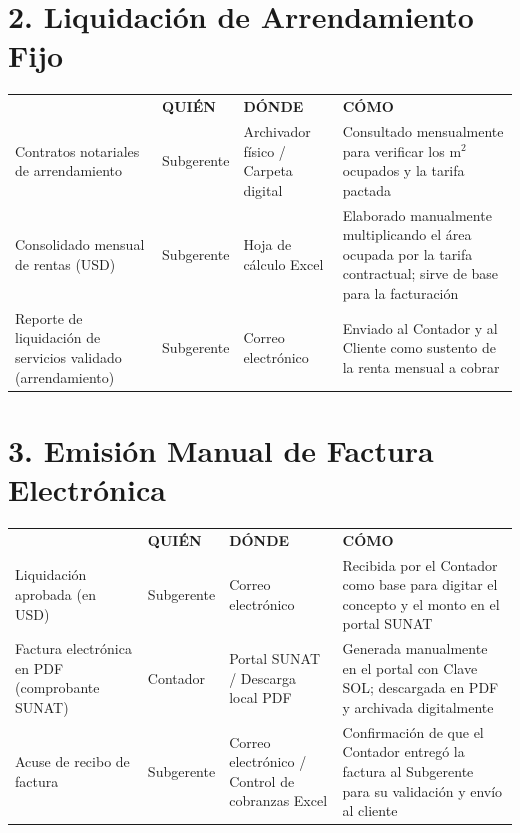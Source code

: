 \documentclass[11pt,letterpaper]{report}
\begin{document}
\section*{2. Liquidación de Arrendamiento Fijo}
\begin{tabularx}{\textwidth}{>{\raggedright\arraybackslash}X >{\raggedright\arraybackslash}p{} >{\raggedright\arraybackslash}p{} >{\raggedright\arraybackslash}X}
\toprule
\multirow{2}{*}{\textbf{DOCUMENTO (QUÉ)}} & \multicolumn{3}{c}{\textbf{CUSTODIA}} \\
\cmidrule{2-4}
& \textbf{QUIÉN} & \textbf{DÓNDE} & \textbf{CÓMO} \\
\midrule
Contratos notariales de arrendamiento & Subgerente & Archivador físico / Carpeta digital & Consultado mensualmente para verificar los m$^2$ ocupados y la tarifa pactada \\
\midrule
Consolidado mensual de rentas (USD) & Subgerente & Hoja de cálculo Excel & Elaborado manualmente multiplicando el área ocupada por la tarifa contractual; sirve de base para la facturación \\
\midrule
Reporte de liquidación de servicios validado (arrendamiento) & Subgerente & Correo electrónico & Enviado al Contador y al Cliente como sustento de la renta mensual a cobrar \\
\bottomrule
\end{tabularx}

\vspace{2em}

\section*{3. Emisión Manual de Factura Electrónica}
\begin{tabularx}{\textwidth}{>{\raggedright\arraybackslash}X >{\raggedright\arraybackslash}p{} >{\raggedright\arraybackslash}p{} >{\raggedright\arraybackslash}X}
\toprule
\multirow{2}{*}{\textbf{DOCUMENTO (QUÉ)}} & \multicolumn{3}{c}{\textbf{CUSTODIA}} \\
\cmidrule{2-4}
& \textbf{QUIÉN} & \textbf{DÓNDE} & \textbf{CÓMO} \\
\midrule
Liquidación aprobada (en USD) & Subgerente & Correo electrónico & Recibida por el Contador como base para digitar el concepto y el monto en el portal SUNAT \\
\midrule
Factura electrónica en PDF (comprobante SUNAT) & Contador & Portal SUNAT / Descarga local PDF & Generada manualmente en el portal con Clave SOL; descargada en PDF y archivada digitalmente \\
\midrule
Acuse de recibo de factura & Subgerente & Correo electrónico / Control de cobranzas Excel & Confirmación de que el Contador entregó la factura al Subgerente para su validación y envío al cliente \\
\bottomrule
\end{tabularx}
\end{document}
